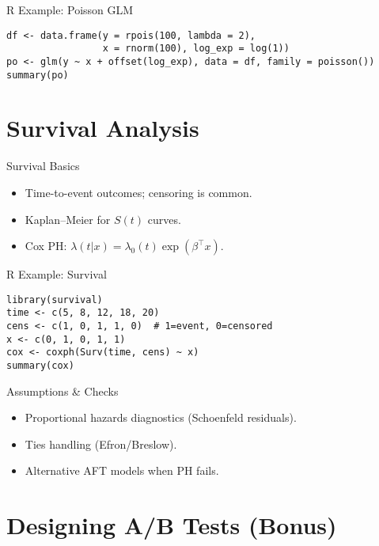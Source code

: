 \documentclass[aspectratio=169]{beamer}
\begin{document}
\begin{frame}[fragile]{R Example: Poisson GLM}
\begin{lstlisting}[style=rcode]
df <- data.frame(y = rpois(100, lambda = 2),
                 x = rnorm(100), log_exp = log(1))
po <- glm(y ~ x + offset(log_exp), data = df, family = poisson())
summary(po)
\end{lstlisting}
\end{frame}

\section{Survival Analysis}

\begin{frame}{Survival Basics}
\begin{itemize}
  \item Time-to-event outcomes; censoring is common.
  \item Kaplan–Meier for $S(t)$ curves.
  \item Cox PH: $\lambda(t|x)=\lambda_0(t)\exp(\beta^\top x)$.
\end{itemize}
\end{frame}

\begin{frame}[fragile]{R Example: Survival}
\begin{lstlisting}[style=rcode]
library(survival)
time <- c(5, 8, 12, 18, 20)
cens <- c(1, 0, 1, 1, 0)  # 1=event, 0=censored
x <- c(0, 1, 0, 1, 1)
cox <- coxph(Surv(time, cens) ~ x)
summary(cox)
\end{lstlisting}
\end{frame}

\begin{frame}{Assumptions \& Checks}
\begin{itemize}
  \item Proportional hazards diagnostics (Schoenfeld residuals).
  \item Ties handling (Efron/Breslow).
  \item Alternative AFT models when PH fails.
\end{itemize}
\end{frame}

\section{Designing A/B Tests (Bonus)}
\end{document}

